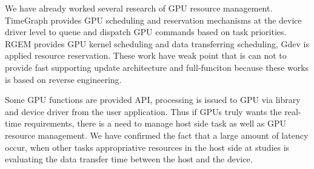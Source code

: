 We have already worked several research of GPU resource management.
TimeGraph\cite{kato:timegraph} provides GPU scheduling and reservation mechanisms at the device driver level to queue and dispatch GPU commands based on task priorities.
RGEM\cite{kato:rgem} provides GPU kernel scheduling and data transferring scheduling, Gdev\cite{kato:gdev} is applied resource reservation.
These work have weak point that is can not to provide fast supporting update architecture and full-funciton because these works is based on reverse engineering.

Some GPU functions are provided API, processing is issued to GPU via library and device driver from the user application.
Thus if GPUs truly wants the real-time requirements,  there is a need to manage host side task as well as GPU resource management.
We have confirmed the fact that a large amount of latency occur,
when other tasks appropriative resources in the host side at studies\cite{fujii:icpads2013} is evaluating the data transfer time between the host and the device.


